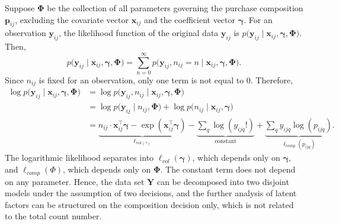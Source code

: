 \documentclass[]{report}
\theoremstyle{definition}
\begin{document}
Suppose $\bm{\Phi}$ be the collection of all parameters governing the purchase composition $\bm{p}_{ij}$, excluding the covariate vector $\bm{x}_{ij}$ and the coefficient vector $\bm{\gamma}$. For an observation $\bm{y}_{ij}$, the likelihood function of the original data $\bm{y}_{ij}$ is $p\bigl(\bm{y}_{ij}\mid \bm{x}_{ij}, \bm{\gamma},\bm{\Phi}\bigr)$. Then,
    \begin{equation}
        p\bigl(\bm{y}_{ij}\mid \bm{x}_{ij}, \bm{\gamma},\bm{\Phi}\bigr) = \sum_{n=0}^{\infty}  p\bigl(\bm{y}_{ij}, n_{ij}=n \mid \bm{x}_{ij}, \bm{\gamma},\bm{\Phi}\bigr).
        \label{eq:totalprobability}
    \end{equation}
Since $n_{ij}$ is fixed for an observation, only one term is not equal to 0. Therefore, 
    \begin{align*}
     \log p\bigl(\bm{y}_{ij}\mid \bm{x}_{ij}, \bm{\gamma},\bm{\Phi}\bigr) &=   \log p\bigl(\bm{y}_{ij}, n_{ij} \mid \bm{x}_{ij}, \bm{\gamma},\bm{\Phi}\bigr)\\
     &= \log p\bigl(\bm{y}_{ij}\mid n_{ij}, \bm{\Phi}\bigr)+\log  p\bigl( n_{ij} \mid \bm{x}_{ij}, \bm{\gamma}\bigr)\\
     &= \underbrace{n_{ij}\cdot \bm{x}_{ij}^{\top} \bm{\gamma}-\exp ( \bm{x}_{ij}^{\top} \bm{\gamma})}_{\ell_{\mathrm{vol}(\gamma)}}-\underbrace{\sum_{q} \log (y_{ijq}!)}_{\mathrm{constant}}+\underbrace{\sum_{q}y_{ijq}\log (p_{ijq})}_{\ell_{comp}(p_{ijq})}.
    \end{align*}
The logarithmic likelihood separates into $\ell_{vol}(\bm{\gamma})$, which depends only on $\bm{\gamma}$,  and $\ell_{comp}(\Phi)$, which depends only on $\bm{\Phi}$. The constant term does not depend on any parameter. Hence, the data set $\bm{Y}$ can be decomposed into two disjoint models under the assumption of two decisions, and the further analysis of latent factors can be structured on the composition decision only, which is not related to the total count number.
\end{document}
